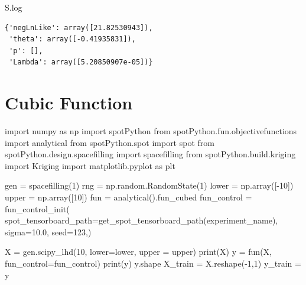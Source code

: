 \documentclass[
  letterpaper,
  DIV=11,
  numbers=noendperiod]{scrreprt}
\newenvironment{Shaded}{\begin{snugshade}}{\end{snugshade}}
\newcommand{\BuiltInTok}[1]{\textcolor[rgb]{0.00,0.23,0.31}{#1}}
\newcommand{\DecValTok}[1]{\textcolor[rgb]{0.68,0.00,0.00}{#1}}
\newcommand{\FloatTok}[1]{\textcolor[rgb]{0.68,0.00,0.00}{#1}}
\newcommand{\ImportTok}[1]{\textcolor[rgb]{0.00,0.46,0.62}{#1}}
\newcommand{\NormalTok}[1]{\textcolor[rgb]{0.00,0.23,0.31}{#1}}
\newcommand{\OperatorTok}[1]{\textcolor[rgb]{0.37,0.37,0.37}{#1}}
\begin{document}
\begin{Shaded}
\begin{Highlighting}[]
\NormalTok{S.log}
\end{Highlighting}
\end{Shaded}

\begin{verbatim}
{'negLnLike': array([21.82530943]),
 'theta': array([-0.41935831]),
 'p': [],
 'Lambda': array([5.20850907e-05])}
\end{verbatim}

\hypertarget{cubic-function}{%
\section{Cubic Function}\label{cubic-function}}

\begin{Shaded}
\begin{Highlighting}[]
\ImportTok{import}\NormalTok{ numpy }\ImportTok{as}\NormalTok{ np}
\ImportTok{import}\NormalTok{ spotPython}
\ImportTok{from}\NormalTok{ spotPython.fun.objectivefunctions }\ImportTok{import}\NormalTok{ analytical}
\ImportTok{from}\NormalTok{ spotPython.spot }\ImportTok{import}\NormalTok{ spot}
\ImportTok{from}\NormalTok{ spotPython.design.spacefilling }\ImportTok{import}\NormalTok{ spacefilling}
\ImportTok{from}\NormalTok{ spotPython.build.kriging }\ImportTok{import}\NormalTok{ Kriging}
\ImportTok{import}\NormalTok{ matplotlib.pyplot }\ImportTok{as}\NormalTok{ plt}

\NormalTok{gen }\OperatorTok{=}\NormalTok{ spacefilling(}\DecValTok{1}\NormalTok{)}
\NormalTok{rng }\OperatorTok{=}\NormalTok{ np.random.RandomState(}\DecValTok{1}\NormalTok{)}
\NormalTok{lower }\OperatorTok{=}\NormalTok{ np.array([}\OperatorTok{{-}}\DecValTok{10}\NormalTok{])}
\NormalTok{upper }\OperatorTok{=}\NormalTok{ np.array([}\DecValTok{10}\NormalTok{])}
\NormalTok{fun }\OperatorTok{=}\NormalTok{ analytical().fun\_cubed}
\NormalTok{fun\_control }\OperatorTok{=}\NormalTok{ fun\_control\_init(}
\NormalTok{    spot\_tensorboard\_path}\OperatorTok{=}\NormalTok{get\_spot\_tensorboard\_path(experiment\_name),}
\NormalTok{    sigma}\OperatorTok{=}\FloatTok{10.0}\NormalTok{,}
\NormalTok{    seed}\OperatorTok{=}\DecValTok{123}\NormalTok{,)}

\NormalTok{X }\OperatorTok{=}\NormalTok{ gen.scipy\_lhd(}\DecValTok{10}\NormalTok{, lower}\OperatorTok{=}\NormalTok{lower, upper }\OperatorTok{=}\NormalTok{ upper)}
\BuiltInTok{print}\NormalTok{(X)}
\NormalTok{y }\OperatorTok{=}\NormalTok{ fun(X, fun\_control}\OperatorTok{=}\NormalTok{fun\_control)}
\BuiltInTok{print}\NormalTok{(y)}
\NormalTok{y.shape}
\NormalTok{X\_train }\OperatorTok{=}\NormalTok{ X.reshape(}\OperatorTok{{-}}\DecValTok{1}\NormalTok{,}\DecValTok{1}\NormalTok{)}
\NormalTok{y\_train }\OperatorTok{=}\NormalTok{ y}


\end{Highlighting}
\end{Shaded}
\end{document}
